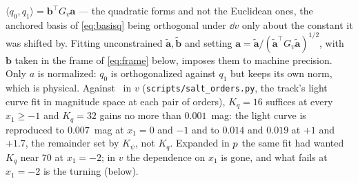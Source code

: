 \documentclass[11pt]{article}
\theoremstyle{plain}
\begin{document}
$\langle q_{0}, q_{1}\rangle = \mathbf{b}^{\top}G_{v}\mathbf{a}$ --- the quadratic forms and
not the Euclidean ones, the anchored basis of \eqref{eq:basisq} being orthogonal under
$\dd v$ only about the constant it was shifted by. Fitting unconstrained
$\tilde{\mathbf{a}}, \tilde{\mathbf{b}}$ and setting
$\mathbf{a} = \tilde{\mathbf{a}}/(\tilde{\mathbf{a}}^{\top}G_{v}\tilde{\mathbf{a}})^{1/2}$,
with $\mathbf{b}$ taken in the frame of \eqref{eq:frame} below, imposes them to machine
precision. Only $a$ is normalized: $q_{0}$ is orthogonalized against
$q_{1}$ but keeps its own norm, which is physical. Against \salt\ in $v$
(\texttt{scripts/salt\_orders.py}, the track's light curve fit in magnitude space at
each pair of orders), $K_{q} = 16$ suffices at every $x_{1} \geq -1$ and $K_{q} = 32$
gains no more than $0.001$~mag: the light curve is reproduced to $0.007$~mag at
$x_{1} = 0$ and $-1$ and to $0.014$ and $0.019$ at $+1$ and $+1.7$, the remainder set by
$K_{\psi}$, not $K_{q}$. Expanded in $p$ the same fit had wanted $K_{q}$ near $70$
at $x_{1} = -2$; in $v$ the dependence on $x_{1}$ is gone, and what fails at $x_{1} = -2$
is the turning (below).
\end{document}
